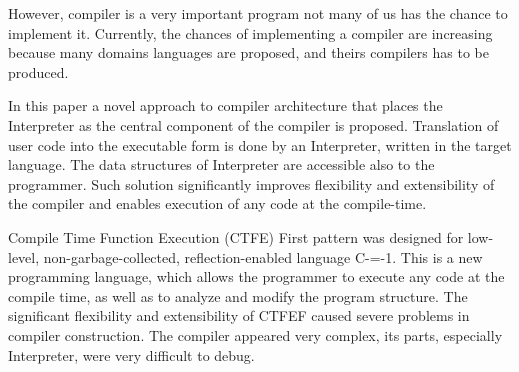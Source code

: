 However, compiler is a very important program not many of us has the chance to implement it. Currently, the chances of implementing a compiler are increasing because many domains languages are proposed, and theirs compilers has to be produced.

In this paper a novel approach to compiler architecture that places the Interpreter as the central component of the compiler is proposed.
Translation of user code into the executable form is done by an Interpreter, written in the target language. The data structures of Interpreter are accessible also to the programmer. Such solution significantly improves flexibility and extensibility of the compiler and enables execution of any code at the compile-time.

Compile Time Function Execution (CTFE) First pattern was designed for low-level, non-garbage-collected, reflection-enabled language C-=-1. This is a new programming language, which allows the programmer to execute any code at the compile time, as well as to analyze and modify the program structure.
The significant flexibility and extensibility of CTFEF caused severe problems in compiler construction. The compiler appeared very complex, its parts, especially Interpreter, were very difficult to debug.
